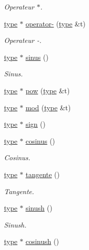 \begin{DoxyCompactItemize}
\begin{DoxyCompactList}\small\item\em Operateur $\ast$. \end{DoxyCompactList}\item 
\hyperlink{classtype}{type} $\ast$ \hyperlink{classcomplexe_ae74ae6a7236ccbdaf74e88e5464ffb43}{operator-\/} (\hyperlink{classtype}{type} \&t)
\begin{DoxyCompactList}\small\item\em Operateur -\/. \end{DoxyCompactList}\item 
\hyperlink{classtype}{type} $\ast$ \hyperlink{classcomplexe_acd102b7928fdd06a6d507cbec365359f}{sinus} ()
\begin{DoxyCompactList}\small\item\em Sinus. \end{DoxyCompactList}\item 
\hyperlink{classtype}{type} $\ast$ \hyperlink{classcomplexe_ab62da214c318ec19868b65394c95723c}{pow} (\hyperlink{classtype}{type} \&t)
\item 
\hyperlink{classtype}{type} $\ast$ \hyperlink{classcomplexe_aed8794b57b6bc231e90e6ea60215368e}{mod} (\hyperlink{classtype}{type} \&t)
\item 
\hyperlink{classtype}{type} $\ast$ \hyperlink{classcomplexe_a9e7f59cfa1dd74f77891d7bfd1c1c62b}{sign} ()
\item 
\hyperlink{classtype}{type} $\ast$ \hyperlink{classcomplexe_a1585612c73f78c15bd20d7800ec834b3}{cosinus} ()
\begin{DoxyCompactList}\small\item\em Cosinus. \end{DoxyCompactList}\item 
\hyperlink{classtype}{type} $\ast$ \hyperlink{classcomplexe_a50af5f9078a27154e61ac579ff54ac15}{tangente} ()
\begin{DoxyCompactList}\small\item\em Tangente. \end{DoxyCompactList}\item 
\hyperlink{classtype}{type} $\ast$ \hyperlink{classcomplexe_a274c87528cc72aa5590319dc797d2d86}{sinush} ()
\begin{DoxyCompactList}\small\item\em Sinush. \end{DoxyCompactList}\item 
\hyperlink{classtype}{type} $\ast$ \hyperlink{classcomplexe_ab5ea61e7d082bd6613cdeed2ac6b522f}{cosinush} ()

\end{DoxyCompactItemize}
